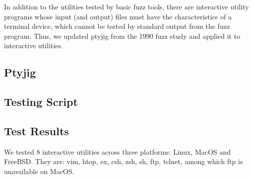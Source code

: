 In addition to the utilities tested by basic fuzz tools, there are interactive utility programs whose input (and output) files must have the characteristics of a terminal device, which cannot be tested by standard output from the fuzz program. Thus, we updated ptyjig from the 1990 fuzz study and applied it to interactive utilities.

\subsection{Ptyjig}


\subsection{Testing Script}


\subsection{Test Results}
We tested 8 interactive utilities across three platforms: Linux, MacOS and FreeBSD. They are: vim, htop, ex, csh, zsh, sh, ftp, telnet, among which ftp is unavailable on MacOS.